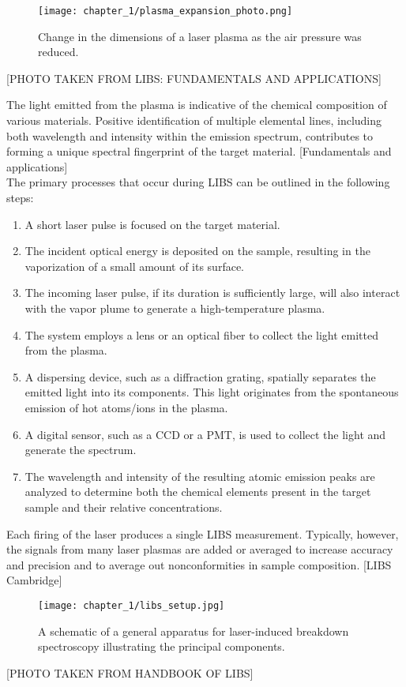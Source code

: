 \begin{figure}[H]
    \centering
    \texttt{[image: chapter\_1/plasma\_expansion\_photo.png]}
    \caption[Photo of a plasma expanding.]{ Change in the dimensions of a laser plasma as the air pressure was reduced.}
    \label{fig:plasma_expansion}
\end{figure}
[PHOTO TAKEN FROM LIBS: FUNDAMENTALS AND APPLICATIONS]

The light emitted from the plasma is indicative of the chemical composition of various materials. Positive identification of multiple elemental lines, including both wavelength and intensity within the emission spectrum, contributes to forming a unique spectral fingerprint of the target material. [Fundamentals and applications]
\\
The primary processes that occur during LIBS can be outlined in the following steps:

\begin{enumerate}
\item A short laser pulse is focused on the target material.
\item The incident optical energy is deposited on the sample, resulting in the vaporization of a small amount of its surface.
\item The incoming laser pulse, if its duration is sufficiently large, will also interact with the vapor plume to generate a high-temperature plasma.
\item The system employs a lens or an optical fiber to collect the light emitted from the plasma.
\item A dispersing device, such as a diffraction grating, spatially separates the emitted light into its components. This light originates from the spontaneous emission of hot atoms/ions in the plasma.
\item A digital sensor, such as a CCD or a PMT, is used to collect the light and generate the spectrum.
\item The wavelength and intensity of the resulting atomic emission peaks are analyzed to determine both the chemical elements present in the target sample and their relative concentrations.
\end{enumerate}
Each firing of the laser produces a single LIBS measurement. Typically, however, the signals from many laser plasmas are added or averaged to increase accuracy and precision and to average out nonconformities in sample composition. [LIBS Cambridge]

\begin{figure}[H]
    \centering
    \texttt{[image: chapter\_1/libs\_setup.jpg]}
    \caption{A schematic of a general apparatus for laser-induced breakdown spectroscopy illustrating the principal components.}
    \label{fig:libs_setup}
\end{figure}
[PHOTO TAKEN FROM HANDBOOK OF LIBS]

